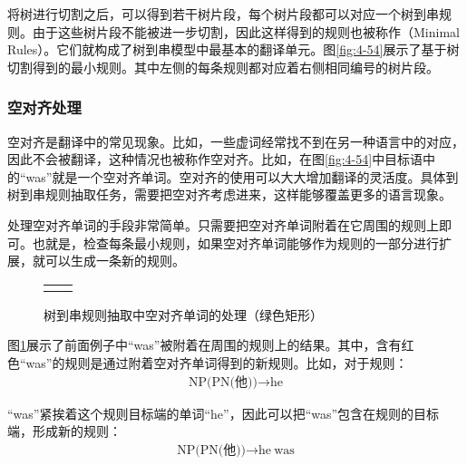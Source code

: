 \parinterval 将树进行切割之后，可以得到若干树片段，每个树片段都可以对应一个树到串规则。由于这些树片段不能被进一步切割，因此这样得到的规则也被称作{\small{}}（Minimal Rules）。它们就构成了树到串模型中最基本的翻译单元。图\ref{fig:4-54}展示了基于树切割得到的最小规则。其中左侧的每条规则都对应着右侧相同编号的树片段。


\subsubsection{空对齐处理}

\parinterval 空对齐是翻译中的常见现象。比如，一些虚词经常找不到在另一种语言中的对应，因此不会被翻译，这种情况也被称作空对齐。比如，在图\ref{fig:4-54}中目标语中的``was''就是一个空对齐单词。空对齐的使用可以大大增加翻译的灵活度。具体到树到串规则抽取任务，需要把空对齐考虑进来，这样能够覆盖更多的语言现象。

\parinterval 处理空对齐单词的手段非常简单。只需要把空对齐单词附着在它周围的规则上即可。也就是，检查每条最小规则，如果空对齐单词能够作为规则的一部分进行扩展，就可以生成一条新的规则。

\begin{figure}[htp]
\centering
\begin{tabular}{l l}
\subfigure{} &  \subfigure{}
\end{tabular}
\caption{树到串规则抽取中空对齐单词的处理（绿色矩形）}
\label{fig:4-55}
\end{figure}

\parinterval 图\ref{fig:4-55}展示了前面例子中``was''被附着在周围的规则上的结果。其中，含有红色``was''的规则是通过附着空对齐单词得到的新规则。比如，对于规则：
\begin{eqnarray}
\textrm{NP(PN(他))} \rightarrow \textrm{he} \nonumber
\end{eqnarray}

\parinterval ``was''紧挨着这个规则目标端的单词``he''，因此可以把``was''包含在规则的目标端，形成新的规则：
\begin{eqnarray}
\textrm{NP(PN(他))} \rightarrow \textrm{he}\ \textrm{was} \nonumber
\end{eqnarray}

